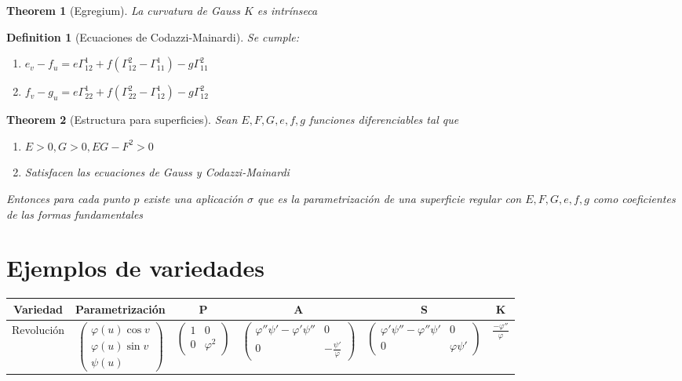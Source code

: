 \documentclass{myclass}
\newtheorem*{definition}{Definition}
\newtheorem*{theorem}{Theorem}
\begin{document}
\begin{theorem}[Egregium] La curvatura de Gauss $K$ es intrínseca
\end{theorem}

\begin{definition}[Ecuaciones de Codazzi-Mainardi] Se cumple:
  \begin{enumerate}[topsep=-6pt, itemsep=0pt]
    \item $e_v-f_u = e\Gamma_{12}^1 + f(\Gamma_{12}^2 - \Gamma _{11}^1) - g\Gamma_{11}^2$
	\item $f_v-g_u = e\Gamma_{22}^1 + f(\Gamma_{22}^2-\Gamma_{12}^1)-g\Gamma_{12}^2$
  \end{enumerate}
\end{definition}

\begin{theorem}[Estructura para superficies] Sean $E, F, G, e, f, g$ funciones diferenciables tal que
   \begin{enumerate}[topsep=-6pt, itemsep=0pt]
    \item $E>0, G>0, EG-F^2>0$
	\item Satisfacen las ecuaciones de Gauss y Codazzi-Mainardi
  \end{enumerate}
Entonces para cada punto $p$ existe una aplicación $\sigma $ que es la parametrización de una superficie regular con $E, F, G, e, f, g$ como coeficientes de las formas fundamentales
\end{theorem}



\section{Ejemplos de variedades}
\begin{center}
\begin{tabular}{|c|c|c|c|c|c|}
\hline
\textbf{Variedad} & \textbf{Parametrización} & \textbf{P} & \textbf{A} & \textbf{S} & \textbf{K} \\
\hline
Revolución & $\begin{pmatrix} \varphi (u)\cos v \\ \varphi (u) \sin v \\ \psi (u) \end{pmatrix} $ & $\begin{pmatrix} 1 & 0 \\ 0 & \varphi^2 \end{pmatrix} $ & $\begin{pmatrix} \varphi ''\psi '-\varphi '\psi ''& 0 \\ 0 & -\frac{\psi '}{\varphi } \end{pmatrix} $ & $\begin{pmatrix} \varphi '\psi ''-\varphi ''\psi '& 0 \\ 0 & \varphi \psi ' \end{pmatrix} $ & $\frac{-\varphi''}{\varphi }$ \\
\hline
\end{tabular}
\end{center}
\end{document}
